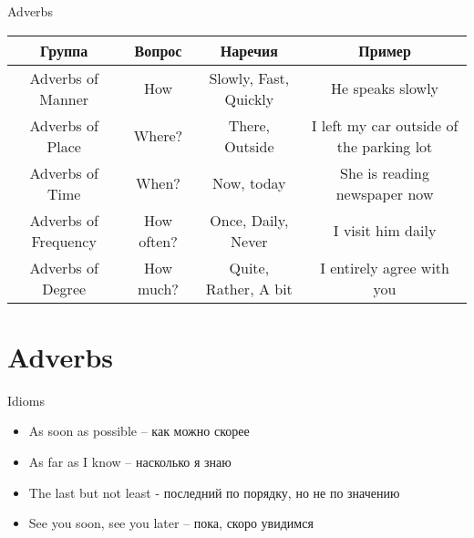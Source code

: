 \documentclass{tstextbook}
\begin{document}
\begin{theorem} Adverbs
	\label{th: Adverbs}
	
	
	
	\begin{tabular}{|c|c|c|c|}
		\hline
		Группа & Вопрос & Наречия & Пример \\ \hline
		Adverbs of Manner & How & Slowly, Fast, Quickly & He speaks slowly \\ \hline
		Adverbs of Place & Where? & There, Outside & I left my car outside of the parking lot \\ \hline
		Adverbs of Time & When? & Now, today & She is reading newspaper now \\ \hline
		Adverbs of Frequency & How often? & Once, Daily, Never & I visit him daily \\ \hline
		Adverbs of Degree & How much? & Quite, Rather, A bit & I entirely agree with you \\ \hline
	\end{tabular}
	
\end{theorem}

\section{Adverbs}

\begin{example} Idioms
	\label{def:Idioms}
	\begin{itemize}
		\item As soon as possible -- как можно скорее
		\item As far as I know -- насколько я знаю
		\item  The last but not least - последний по порядку, но не по значению
		\item See you soon, see you later -- пока, скоро увидимся	
	\end{itemize}
\end{example}

	
	
	
	
	\printindex
	
\end{document}
